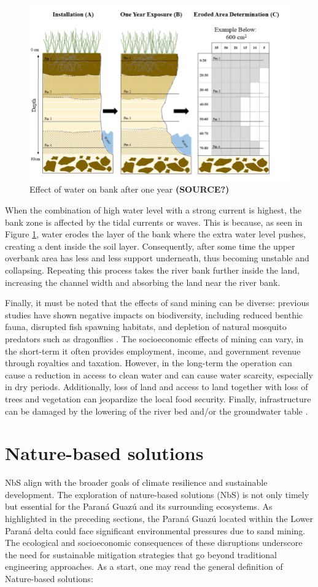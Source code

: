 \begin{figure}[H]
    \centering
    \includegraphics[width=0.5\linewidth]{figures/ch2/Erosion.png}
    \caption{Effect of water on bank after one year \textbf{(SOURCE?)}}
    \label{fig:Effect of Water on Bank after One Year}
\end{figure}

When the combination of high water level with a strong current is highest, the bank zone is affected by the tidal currents or waves. This is because, as seen in Figure \ref{fig:Effect of Water on Bank after One Year}, water erodes the layer of the bank where the extra water level pushes, creating a dent inside the soil layer.
Consequently, after some time the upper overbank area has less and less support underneath, thus becoming unstable and collapsing. 
Repeating this process takes the river bank further inside the land, increasing the channel width and absorbing the land near the river bank. 

Finally, it must be noted that the effects of sand mining can be diverse: previous studies have shown negative impacts on biodiversity, including reduced benthic fauna, disrupted fish spawning habitats, and depletion of natural mosquito predators such as dragonflies \autocite{sand-mining-boek}. The socioeconomic effects of mining can vary, in the short-term it often provides employment, income, and government revenue through royalties and taxation. However, in the long-term the operation can cause a reduction in access to clean water and can cause water scarcity, especially in dry periods. Additionally, loss of land and access to land together with loss of trees and vegetation can jeopardize the local food security. Finally, infrastructure can be damaged by the lowering of the river bed and/or the groundwater table \autocite{sand-mining-boek}.

\section{Nature-based solutions}
 NbS align with the broader goals of climate resilience and sustainable development. The exploration of nature-based solutions (NbS) is not only timely but essential for the Paraná Guazú and its surrounding ecosystems. As highlighted in the preceding sections, the Paraná Guazú located within the Lower Paraná delta could face significant environmental pressures due to sand mining. The ecological and socioeconomic consequences of these disruptions underscore the need for sustainable mitigation strategies that go beyond traditional engineering approaches. As a start, one may read the general definition of Nature-based solutions:


